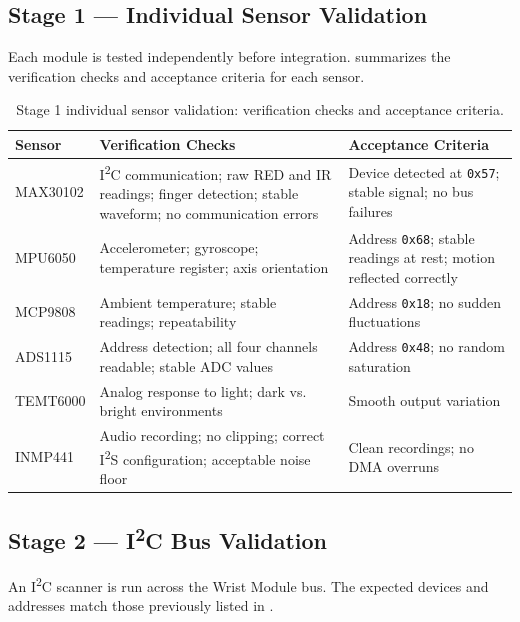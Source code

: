 \subsection{Stage 1 --- Individual Sensor Validation}
\label{sec:stage1-sensor-validation}

Each module is tested independently before integration.  summarizes the verification checks and acceptance criteria for each sensor.

\begin{table}[t]
\centering
\caption{Stage 1 individual sensor validation: verification checks and acceptance criteria.}
\label{tab:sensor-validation}
\small
\begin{tabularx}{\textwidth}{@{}l Y Y@{}}
\toprule
\textbf{Sensor} & \textbf{Verification Checks} & \textbf{Acceptance Criteria} \\
\midrule
MAX30102 & I\textsuperscript{2}C communication; raw RED and IR readings; finger detection; stable waveform; no communication errors & Device detected at \texttt{0x57}; stable signal; no bus failures \\
MPU6050 & Accelerometer; gyroscope; temperature register; axis orientation & Address \texttt{0x68}; stable readings at rest; motion reflected correctly \\
MCP9808 & Ambient temperature; stable readings; repeatability & Address \texttt{0x18}; no sudden fluctuations \\
ADS1115 & Address detection; all four channels readable; stable ADC values & Address \texttt{0x48}; no random saturation \\
TEMT6000 & Analog response to light; dark vs. bright environments & Smooth output variation \\
INMP441 & Audio recording; no clipping; correct I\textsuperscript{2}S configuration; acceptable noise floor & Clean recordings; no DMA overruns \\
\bottomrule
\end{tabularx}
\end{table}

\subsection{Stage 2 --- I\texorpdfstring{\textsuperscript{2}}{2}C Bus Validation}
\label{sec:stage2-i2c-validation}

An I\textsuperscript{2}C scanner is run across the Wrist Module bus. The expected devices and addresses match those previously listed in .


